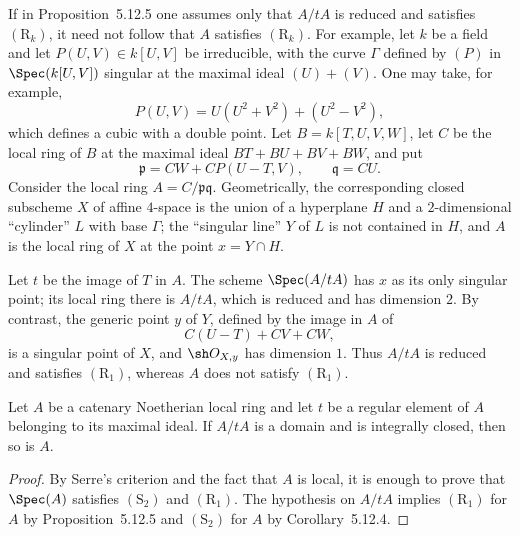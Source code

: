 \begin{remark}[5.12.6]
\label{IV.5.12.6}
If in Proposition~5.12.5 one assumes only that $A/tA$ is reduced
and satisfies $(\mathrm R_k)$, it need not follow that $A$
satisfies $(\mathrm R_k)$.  For example, let $k$ be a field and
let $P(U,V)\in k[U,V]$ be irreducible, with the curve $\Gamma$
defined by $(P)$ in $\Spec(k[U,V])$ singular at the maximal ideal
$(U)+(V)$.  One may take, for example,
\[
  P(U,V)=U(U^2+V^2)+(U^2-V^2),
\]
which defines a cubic with a double point.  Let
$B=k[T,U,V,W]$, let $C$ be the local ring of $B$ at the maximal
ideal $BT+BU+BV+BW$, and put
\[
  \mathfrak p=CW+CP(U-T,V),\qquad \mathfrak q=CU.
\]
Consider the local ring $A=C/\mathfrak p\mathfrak q$.
Geometrically, the corresponding closed subscheme $X$ of affine
$4$-space is the union of a hyperplane $H$ and a
$2$-dimensional ``cylinder'' $L$ with base $\Gamma$; the
``singular line'' $Y$ of $L$ is not contained in $H$, and $A$ is
the local ring of $X$ at the point $x=Y\cap H$.

Let $t$ be the image of $T$ in $A$.  The scheme
$\Spec(A/tA)$ has $x$ as its only singular point; its local ring
there is $A/tA$, which is reduced and has dimension $2$.  By
contrast, the generic point $y$ of $Y$, defined by the image in
$A$ of
\[
  C(U-T)+CV+CW,
\]
is a singular point of $X$, and $\sh O_{X,y}$ has dimension $1$.
Thus $A/tA$ is reduced and satisfies $(\mathrm R_1)$, whereas
$A$ does not satisfy $(\mathrm R_1)$.
\end{remark}


\begin{corollary}[5.12.7]
\label{IV.5.12.7}
Let $A$ be a catenary Noetherian local ring and let $t$ be a
regular element of $A$ belonging to its maximal ideal.  If
$A/tA$ is a domain and is integrally closed, then so is $A$.
\end{corollary}

\begin{proof}
By Serre's criterion  and the fact that $A$ is
local, it is enough to prove that $\Spec(A)$ satisfies
$(\mathrm S_2)$ and $(\mathrm R_1)$.  The hypothesis on $A/tA$
implies $(\mathrm R_1)$ for $A$ by Proposition~5.12.5 and
$(\mathrm S_2)$ for $A$ by Corollary~5.12.4.
\end{proof}
